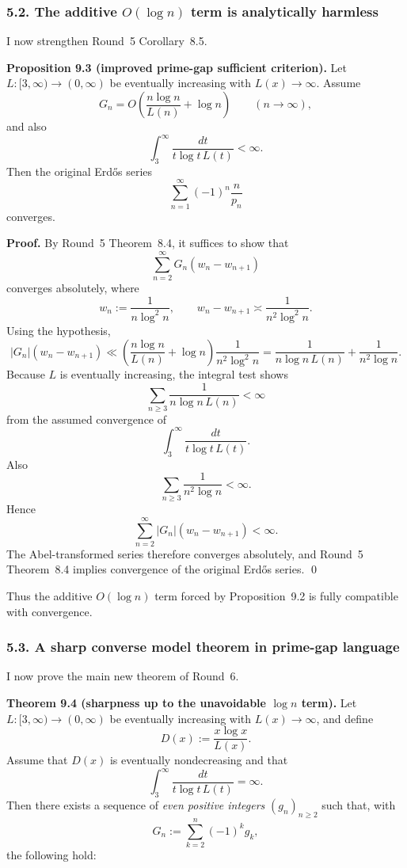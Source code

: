 \subsubsection*{5.2. The additive \(O(\log n)\) term is analytically harmless}

I now strengthen Round~5 Corollary~8.5.

\textbf{Proposition 9.3 (improved prime-gap sufficient criterion).}
Let \(L:[3,\infty)\to (0,\infty)\) be eventually increasing with \(L(x)\to\infty\).
Assume
\[
G_n = O\!\left(\frac{n\log n}{L(n)}+\log n\right)
\qquad (n\to\infty),
\]
and also
\[
\int_3^\infty \frac{dt}{t\log t\,L(t)}<\infty.
\]
Then the original Erd\H{o}s series
\[
\sum_{n=1}^\infty (-1)^n \frac{n}{p_n}
\]
converges.

\textbf{Proof.}
By Round~5 Theorem~8.4, it suffices to show that
\[
\sum_{n=2}^\infty G_n(w_n-w_{n+1})
\]
converges absolutely, where
\[
w_n:=\frac{1}{n\log^2 n},
\qquad
w_n-w_{n+1}\asymp \frac{1}{n^2\log^2 n}.
\]
Using the hypothesis,
\[
|G_n|(w_n-w_{n+1})
\ll
\left(\frac{n\log n}{L(n)}+\log n\right)\frac{1}{n^2\log^2 n}
=
\frac{1}{n\log n\,L(n)}+\frac{1}{n^2\log n}.
\]
Because \(L\) is eventually increasing, the integral test shows
\[
\sum_{n\ge 3}\frac{1}{n\log n\,L(n)}<\infty
\]
from the assumed convergence of
\[
\int_3^\infty \frac{dt}{t\log t\,L(t)}.
\]
Also
\[
\sum_{n\ge 3}\frac{1}{n^2\log n}<\infty.
\]
Hence
\[
\sum_{n=2}^\infty |G_n|(w_n-w_{n+1})<\infty.
\]
The Abel-transformed series therefore converges absolutely, and Round~5 Theorem~8.4 implies convergence of the original Erd\H{o}s series. \qed

\medskip

Thus the additive \(O(\log n)\) term forced by Proposition~9.2 is fully compatible with convergence.

\subsubsection*{5.3. A sharp converse model theorem in prime-gap language}

I now prove the main new theorem of Round~6.

\textbf{Theorem 9.4 (sharpness up to the unavoidable \(\log n\) term).}
Let \(L:[3,\infty)\to (0,\infty)\) be eventually increasing with \(L(x)\to\infty\), and define
\[
D(x):=\frac{x\log x}{L(x)}.
\]
Assume that \(D(x)\) is eventually nondecreasing and that
\[
\int_3^\infty \frac{dt}{t\log t\,L(t)}=\infty.
\]
Then there exists a sequence of \emph{even positive integers} \((g_n)_{n\ge 2}\) such that, with
\[
G_n:=\sum_{k=2}^n (-1)^k g_k,
\]
the following hold:

